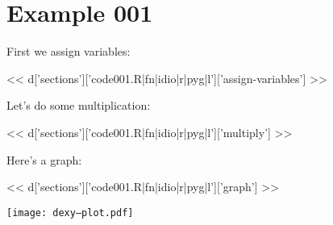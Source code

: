 \section{Example 001}

First we assign variables:

<< d['sections']['code001.R|fn|idio|r|pyg|l']['assign-variables'] >>

Let's do some multiplication:

<< d['sections']['code001.R|fn|idio|r|pyg|l']['multiply'] >>

Here's a graph:

<< d['sections']['code001.R|fn|idio|r|pyg|l']['graph'] >>

\texttt{[image: dexy--plot.pdf]}

